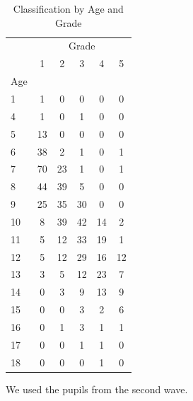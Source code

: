\documentclass[fleqn,11pt]{article}
\begin{document}
\begin{table}[h]
\caption{Classification by Age and Grade}
\label{t:ageandclass_2nd}\centering
\begin{adjustbox}{max width=\textwidth}
\begin{threeparttable}
\begin{tabular}{l*{5}{c}}
\hline\hline
            &\multicolumn{5}{c}{Grade}                                            \\
       &          1&          2&          3&          4&          5\\
    Age         &  \quad     &    \quad   &    \quad   &    \quad   &   \quad    \\
\hline
1           &           1&           0&           0&           0&           0\\
4           &           1&           0&           1&           0&           0\\
5           &          13&           0&           0&           0&           0\\
6           &          38&           2&           1&           0&           1\\
7           &          70&          23&           1&           0&           1\\
8           &          44&          39&           5&           0&           0\\
9           &          25&          35&          30&           0&           0\\
10          &           8&          39&          42&          14&           2\\
11          &           5&          12&          33&          19&           1\\
12          &           5&          12&          29&          16&          12\\
13          &           3&           5&          12&          23&           7\\
14          &           0&           3&           9&          13&           9\\
15          &           0&           0&           3&           2&           6\\
16          &           0&           1&           3&           1&           1\\
17          &           0&           0&           1&           1&           0\\
18          &           0&           0&           0&           1&           0\\
\hline\hline
\end{tabular}
\begin{tablenotes}
\item We used the pupils from the second wave.
\end{tablenotes}
\end{threeparttable}
\end{adjustbox}

\end{table}
\end{document}
